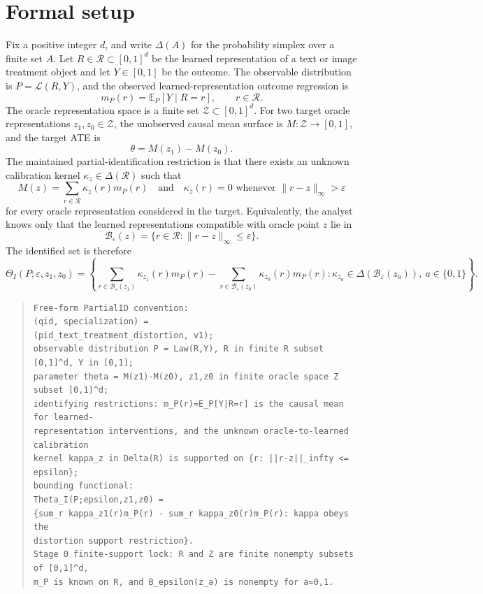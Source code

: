 \documentclass[11pt]{article}
\newcommand{\E}{\mathbb{E}}
\theoremstyle{definition}
\theoremstyle{plain}
\theoremstyle{remark}
\begin{document}
\section{Formal setup}
Fix a positive integer \(d\), and write \(\Delta(A)\) for the probability simplex over a finite set \(A\). Let \(R\in\mathcal R\subset[0,1]^d\) be the learned representation of a text or image treatment object and let \(Y\in[0,1]\) be the outcome. The observable distribution is \(P=\mathcal L(R,Y)\), and the observed learned-representation outcome regression is
\[
m_P(r)=\E_P[Y\mid R=r],\qquad r\in\mathcal R.
\]
The oracle representation space is a finite set \(\mathcal Z\subset[0,1]^d\). For two target oracle representations \(z_1,z_0\in\mathcal Z\), the unobserved causal mean surface is \(M:\mathcal Z\to[0,1]\), and the target ATE is
\[
\theta=M(z_1)-M(z_0).
\]
The maintained partial-identification restriction is that there exists an unknown calibration kernel \(\kappa_z\in\Delta(\mathcal R)\) such that
\[
M(z)=\sum_{r\in\mathcal R}\kappa_z(r)m_P(r)
\quad\text{and}\quad
\kappa_z(r)=0\text{ whenever }\|r-z\|_\infty>\varepsilon
\]
for every oracle representation considered in the target. Equivalently, the analyst knows only that the learned representations compatible with oracle point \(z\) lie in
\[
\mathcal B_\varepsilon(z)=\{r\in\mathcal R:\|r-z\|_\infty\le\varepsilon\}.
\]
The identified set is therefore
\[
\Theta_I(P;\varepsilon,z_1,z_0)=
\left\{\sum_{r\in\mathcal B_\varepsilon(z_1)}\kappa_{z_1}(r)m_P(r)
-\sum_{r\in\mathcal B_\varepsilon(z_0)}\kappa_{z_0}(r)m_P(r):
\kappa_{z_a}\in\Delta(\mathcal B_\varepsilon(z_a)),\ a\in\{0,1\}\right\}.
\]

\begin{quote}
\begin{verbatim}
Free-form PartialID convention:
(qid, specialization) =
(pid_text_treatment_distortion, v1);
observable distribution P = Law(R,Y), R in finite R subset [0,1]^d, Y in [0,1];
parameter theta = M(z1)-M(z0), z1,z0 in finite oracle space Z subset [0,1]^d;
identifying restrictions: m_P(r)=E_P[Y|R=r] is the causal mean for learned-
representation interventions, and the unknown oracle-to-learned calibration
kernel kappa_z in Delta(R) is supported on {r: ||r-z||_infty <= epsilon};
bounding functional:
Theta_I(P;epsilon,z1,z0) =
{sum_r kappa_z1(r)m_P(r) - sum_r kappa_z0(r)m_P(r): kappa obeys the
distortion support restriction}.
Stage 0 finite-support lock: R and Z are finite nonempty subsets of [0,1]^d,
m_P is known on R, and B_epsilon(z_a) is nonempty for a=0,1.
\end{verbatim}
\end{quote}
\end{document}
